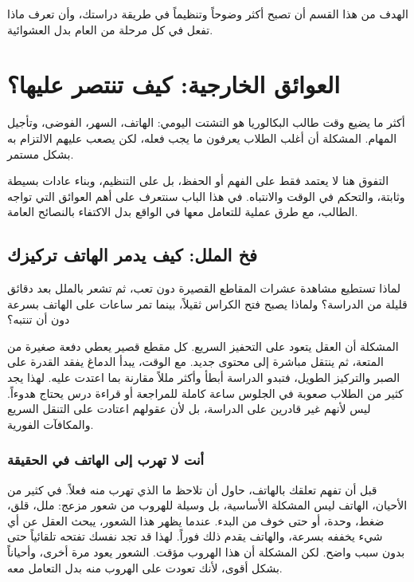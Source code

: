\documentclass[12pt,a4paper]{book}
\begin{document}
الهدف من هذا القسم أن تصبح أكثر وضوحاً وتنظيماً في طريقة دراستك، وأن تعرف ماذا تفعل في كل مرحلة من العام بدل العشوائية.


\chapter{العوائق الخارجية: كيف تنتصر عليها؟}
\label{sec:owner-experiences5}
\label{chap:enemies}

أكثر ما يضيع وقت طالب البكالوريا هو التشتت اليومي: الهاتف، السهر، الفوضى، وتأجيل المهام. المشكلة أن أغلب الطلاب يعرفون ما يجب فعله، لكن يصعب عليهم الالتزام به بشكل مستمر.

التفوق هنا لا يعتمد فقط على الفهم أو الحفظ، بل على التنظيم، وبناء عادات بسيطة وثابتة، والتحكم في الوقت والانتباه. في هذا الباب سنتعرف على أهم العوائق التي تواجه الطالب، مع طرق عملية للتعامل معها في الواقع بدل الاكتفاء بالنصائح العامة.

\section{فخ الملل: كيف يدمر الهاتف تركيزك}
\label{sec:short-videos-boredom}

لماذا تستطيع مشاهدة عشرات المقاطع القصيرة دون تعب، ثم تشعر بالملل بعد دقائق قليلة من الدراسة؟ ولماذا يصبح فتح الكراس ثقيلاً، بينما تمر ساعات على الهاتف بسرعة دون أن تنتبه؟ 

المشكلة أن العقل يتعود على التحفيز السريع. كل مقطع قصير يعطي دفعة صغيرة من المتعة، ثم ينتقل مباشرة إلى محتوى جديد. مع الوقت، يبدأ الدماغ يفقد القدرة على الصبر والتركيز الطويل، فتبدو الدراسة أبطأ وأكثر مللاً مقارنة بما اعتدت عليه. لهذا يجد كثير من الطلاب صعوبة في الجلوس ساعة كاملة للمراجعة أو قراءة درس يحتاج هدوءاً. ليس لأنهم غير قادرين على الدراسة، بل لأن عقولهم اعتادت على التنقل السريع والمكافآت الفورية.

\subsection{أنت لا تهرب إلى الهاتف في الحقيقة}

قبل أن تفهم تعلقك بالهاتف، حاول أن تلاحظ ما الذي تهرب منه فعلاً. في كثير من الأحيان، الهاتف ليس المشكلة الأساسية، بل وسيلة للهروب من شعور مزعج: ملل، قلق، ضغط، وحدة، أو حتى خوف من البدء. عندما يظهر هذا الشعور، يبحث العقل عن أي شيء يخففه بسرعة، والهاتف يقدم ذلك فوراً. لهذا قد تجد نفسك تفتحه تلقائياً حتى بدون سبب واضح. لكن المشكلة أن هذا الهروب مؤقت. الشعور يعود مرة أخرى، وأحياناً بشكل أقوى، لأنك تعودت على الهروب منه بدل التعامل معه.
\end{document}
